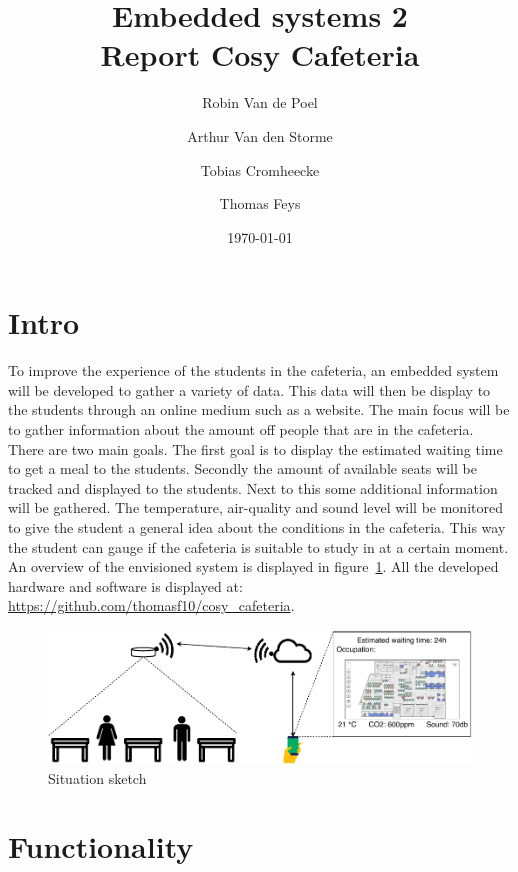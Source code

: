 \documentclass[11pt,a4paper]{article}
\begin{document}
\title{Embedded systems 2\\
	\Huge Report Cosy Cafeteria
}
\author{Robin Van de Poel\and Arthur Van den Storme\and Tobias Cromheecke\and Thomas Feys}
\date{\today}
\maketitle
\newpage

\tableofcontents
\newpage

\section{Intro}
To improve the experience of the students in the cafeteria, an embedded system will be developed to gather a variety of data. This data will then be display to the students through an online medium such as a website. The main focus will be to gather information about the amount off people that are in the cafeteria. There are two main goals. The first goal is to display the estimated waiting time to get a meal to the students. Secondly the amount of available seats will be tracked and displayed to the students. Next to this some additional information will be gathered. The temperature, air-quality and sound level will be monitored to give the student a general idea about the conditions in the cafeteria. This way the student can gauge if the cafeteria is suitable to study in at a certain moment. An overview of the envisioned system is displayed in figure~\ref{fig:system}. All the developed hardware and software is displayed at: \url{https://github.com/thomasf10/cosy_cafeteria}.
\begin{figure}[H]
	\centering
	\includegraphics[width=1.0\linewidth]{situation.pdf}
	\caption{Situation sketch}
	\label{fig:system}
\end{figure}


\section{Functionality}
\end{document}
